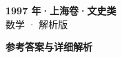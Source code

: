 \documentclass[zihao=-4, a4paper]{ctexart}
\begin{document}
\begin{center}
  {\Large\bfseries 1997 年·上海卷·文史类}\\[4pt]
  {\large 数学 · 解析版}
\end{center}
\medskip
{}

\clearpage
{}
\begin{center}{\Large\bfseries 参考答案与详细解析}\end{center}
\medskip

\end{document}
